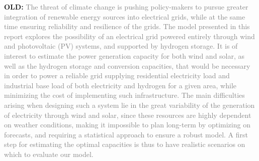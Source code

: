 \textbf{OLD:}
\textcolor{gray}{
The threat of climate change is pushing policy-makers to pursue greater integration of renewable energy sources into electrical grids, while at the same time ensuring reliability and resilience of the grids. The model presented in this report explores the possibility of an electrical grid powered entirely through wind and photovoltaic (PV) systems, and supported by hydrogen storage.
It is of interest to estimate the power generation capacity for both wind and solar, as well as the hydrogen storage and conversion capacities, that would be necessary in order to power a reliable grid supplying residential electricity load and industrial base load of both electricity and hydrogen for a given area, while minimizing the cost of implementing such infrastructure.
The main difficulties arising when designing such a system lie in the great variability of the generation of electricity through wind and solar, since these resources are highly dependent on weather conditions, making it impossible to plan long-term by optimizing on forecasts, and requiring a statistical approach to ensure a robust model.
A first step for estimating the optimal capacities is thus to have realistic scenarios on which to evaluate our model.}
